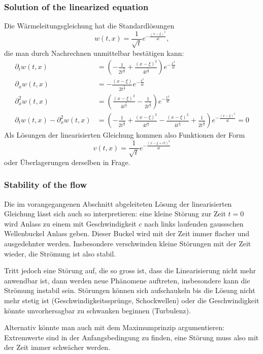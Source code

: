 \subsubsection{Solution of the linearized equation}
Die Wärmeleitungsgleichung hat die Standardlösungen
\[
w(t,x)=\frac1{\sqrt{t}}e^{-\frac{(x-\xi)^2}{4t}},
\]
die man durch Nachrechnen unmittelbar bestätigen kann:
\begin{align*}
\partial_t w(t,x)
&=
\left(
-\frac1{2t^{\frac32}}
+\frac{(x-\xi)^2}{4t^{\frac52}}
\right)e^{-\frac{x^2}{4t}}
\\
\partial_x w(t,x)
&=
-\frac{(x-\xi)}{2t^{\frac32}}
e^{-\frac{x^2}{4t}}
\\
\partial_x^2w(t,x)
&=
\left(
\frac{(x-\xi)^2}{4t^{\frac52}}
-\frac{1}{2t^{\frac32}}
\right)e^{-\frac{x^2}{4t}}
\\
\partial_tw(t,x)-\partial_x^2w(t,x)
&=
\left(
-\frac1{2t^{\frac32}}
+\frac{(x-\xi)^2}{4t^{\frac52}}
-\frac{(x-\xi)^2}{4t^{\frac52}}
+\frac{1}{2t^{\frac32}}
\right)e^{-\frac{(x-\xi)^2}{4t}}=0
\end{align*}
Als Lösungen der linearisierten Gleichung kommen also Funktionen der
Form
\[
v(t,x)=\frac1{\sqrt{t}}e^{-\frac{(x-\xi+ct)^2}{4t}}
\]
oder Überlagerungen derselben in Frage.

\subsubsection{Stability of the flow}
Die im vorangegangenen Abschnitt abgeleiteten Lösung der linearisierten
Gleichung lässt sich auch so interpretieren: eine kleine Störung zur Zeit
$t=0$ wird Anlass zu einem mit Geschwindigkeit $c$ nach links
laufenden gaussschen Wellenbuckel Anlass geben. Dieser Buckel wird mit
der Zeit immer flacher und ausgedehnter werden. Insbesondere verschwinden
kleine Störungen mit der Zeit wieder, die Strömung ist also stabil.

Tritt jedoch eine Störung auf, die so gross ist, dass die Linearisierung
nicht mehr anwendbar ist, dann werden neue Phänomene auftreten, insbesondere kann
die Strömung instabil sein. Störungen können sich aufschaukeln bis die
Lösung nicht mehr stetig ist (Geschwindigkeitssprünge, Schockwellen)
oder die Geschwindigkeit könnte unvorhersagbar zu schwanken beginnen
(Turbulenz).

Alternativ könnte man auch mit dem Maximumprinzip argumentieren: Extremwerte
sind in der Anfangsbedingung zu finden, eine Störung muss also mit der
Zeit immer schwächer werden.

